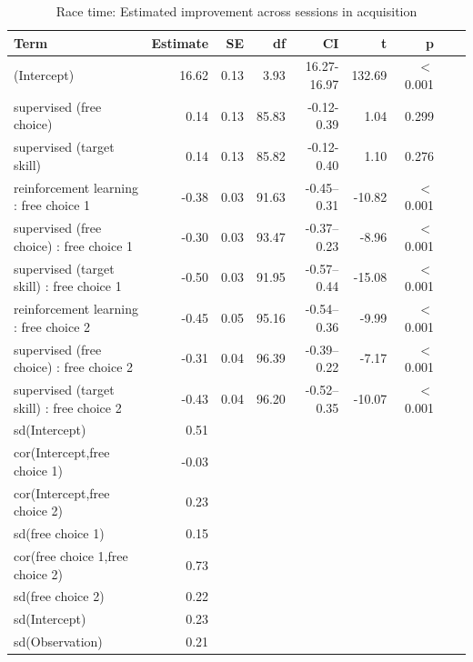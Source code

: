 \documentclass[pdflatex,sn-mathphys-num]{sn-jnl}%
\theoremstyle{thmstyleone}%
\theoremstyle{thmstyletwo}%
\theoremstyle{thmstylethree}%
\begin{document}
\begin{appendices}
\begin{table}[h!]
\caption{Race time: Estimated improvement across sessions in acquisition}\label{table_racetime_acquisition_change}
\centering
\begin{tabular}{lrrrrrrrr}
  \hline
 Term & Estimate & SE & df & CI & t & p \\ 
  \hline
 (Intercept) & 16.62 & 0.13 & 3.93 & 16.27-16.97 & 132.69 &  $<$  0.001 \\ 
   supervised (free choice) & 0.14 & 0.13 & 85.83 & -0.12-0.39 & 1.04 &    0.299 \\ 
   supervised (target skill) & 0.14 & 0.13 & 85.82 & -0.12-0.40 & 1.10 &    0.276 \\ 
  reinforcement learning : free choice 1 & -0.38 & 0.03 & 91.63 & -0.45--0.31 & -10.82 &  $<$  0.001 \\ 
   supervised (free choice) : free choice 1 & -0.30 & 0.03 & 93.47 & -0.37--0.23 & -8.96 &  $<$  0.001 \\ 
   supervised (target skill) : free choice 1 & -0.50 & 0.03 & 91.95 & -0.57--0.44 & -15.08 &  $<$  0.001 \\ 
   reinforcement learning : free choice 2 & -0.45 & 0.05 & 95.16 & -0.54--0.36 & -9.99 &  $<$  0.001 \\ 
   supervised (free choice) : free choice 2 & -0.31 & 0.04 & 96.39 & -0.39--0.22 & -7.17 &  $<$  0.001 \\ 
   supervised (target skill) : free choice 2 & -0.43 & 0.04 & 96.20 & -0.52--0.35 & -10.07 &  $<$  0.001 \\ 
   sd(Intercept) & 0.51 &  &  &  &  &  &  \\ 
   cor(Intercept,free choice 1) & -0.03 &  &  &  &  &  &  \\ 
   cor(Intercept,free choice 2) & 0.23 &  &  &  &  &  &  \\ 
   sd(free choice 1) & 0.15 &  &  &  &  &  &  \\ 
   cor(free choice 1,free choice 2) & 0.73 &  &  &  &  &  &  \\ 
  sd(free choice 2) & 0.22 &  &  &  &  &  &  \\ 
   sd(Intercept) & 0.23 &  &  &  &  &  &  \\ 
   sd(Observation) & 0.21 &  &  &  &  &  &  \\ 
   \hline
\end{tabular}
\end{table}



\end{appendices}
\end{document}
